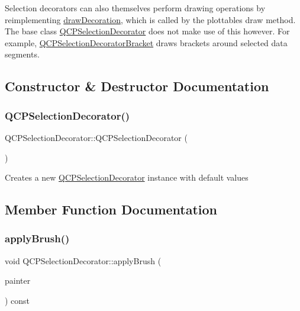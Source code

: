 Selection decorators can also themselves perform drawing operations by reimplementing \hyperlink{classQCPSelectionDecorator_a4f8eb49e277063845391e803ae23054a}{draw\+Decoration}, which is called by the plottable\textquotesingle{}s draw method. The base class \hyperlink{classQCPSelectionDecorator}{Q\+C\+P\+Selection\+Decorator} does not make use of this however. For example, \hyperlink{classQCPSelectionDecoratorBracket}{Q\+C\+P\+Selection\+Decorator\+Bracket} draws brackets around selected data segments. 

\subsection{Constructor \& Destructor Documentation}
\mbox{\label{classQCPSelectionDecorator_aa145480d9a062cd176fe30900bb7bca8}} 
\subsubsection{\texorpdfstring{Q\+C\+P\+Selection\+Decorator()}{QCPSelectionDecorator()}}
{\footnotesize\ttfamily Q\+C\+P\+Selection\+Decorator\+::\+Q\+C\+P\+Selection\+Decorator (\begin{DoxyParamCaption}{ }\end{DoxyParamCaption})}

Creates a new \hyperlink{classQCPSelectionDecorator}{Q\+C\+P\+Selection\+Decorator} instance with default values 

\subsection{Member Function Documentation}
\mbox{\label{classQCPSelectionDecorator_a225544527d51b49546b70d0e6d655a34}} 
\subsubsection{\texorpdfstring{apply\+Brush()}{applyBrush()}}
{\footnotesize\ttfamily void Q\+C\+P\+Selection\+Decorator\+::apply\+Brush (\begin{DoxyParamCaption}\item[{\hyperlink{classQCPPainter}{Q\+C\+P\+Painter} $\ast$}]{painter }\end{DoxyParamCaption}) const}

